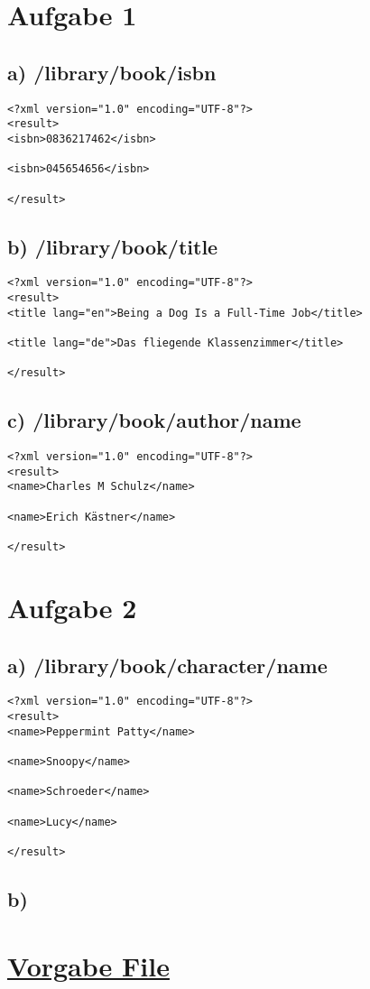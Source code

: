\documentclass{az_article}
\author{Andreas Zweili}
\date{\today}
\title{}
\begin{document}
\tableofcontents
    \newpage
    \section{Aufgabe 1}
\label{sec:org19289e8}
\subsection{a) /library/book/isbn}
\label{sec:orgd8d994d}
\begin{verbatim}
<?xml version="1.0" encoding="UTF-8"?>
<result>
<isbn>0836217462</isbn>

<isbn>045654656</isbn>

</result>
\end{verbatim}
\subsection{b) /library/book/title}
\label{sec:orgc884de6}
\begin{verbatim}
<?xml version="1.0" encoding="UTF-8"?>
<result>
<title lang="en">Being a Dog Is a Full-Time Job</title>

<title lang="de">Das fliegende Klassenzimmer</title>

</result>
\end{verbatim}
\subsection{c) /library/book/author/name}
\label{sec:org498de01}
\begin{verbatim}
<?xml version="1.0" encoding="UTF-8"?>
<result>
<name>Charles M Schulz</name>

<name>Erich Kästner</name>

</result>
\end{verbatim}
\section{Aufgabe 2}
\label{sec:org9eccf58}
\subsection{a) /library/book/character/name}
\label{sec:org6495209}
\begin{verbatim}
<?xml version="1.0" encoding="UTF-8"?>
<result>
<name>Peppermint Patty</name>

<name>Snoopy</name>

<name>Schroeder</name>

<name>Lucy</name>

</result>
\end{verbatim}

\subsection{b)}
\label{sec:org7b2348a}
\section{\href{xpath\_vorlage.xml}{Vorgabe File}}
\label{sec:orge9a4a1a}
\end{document}
